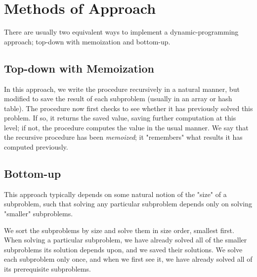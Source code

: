 \newpage
\section{Methods of Approach}
There are usually two equivalent ways to implement a dynamic-programming
approach; top-down with memoization and bottom-up.

\subsection{Top-down with Memoization}
In this approach, we write the procedure recursively in a natural manner, but
modified to save the result of each subproblem (usually in an array or hash
table). The procedure now first checks to see whether it has previously solved
this problem. If so, it returns the saved value, saving further computation at
this level; if not, the procedure computes the value in the usual manner. We
say that the recursive procedure has been \textit{memoized}; it "remembers"
what results it has computed previously.

\subsection{Bottom-up}
This approach typically depends on some natural notion of the "size" of a
subproblem, such that solving any particular subproblem depends only on
solving "smaller" subproblems.

We sort the subproblems by size and solve them in size order, smallest first.
When solving a particular subproblem, we have already solved all of the
smaller subproblems its solution depends upon, and we saved their solutions.
We solve each subproblem only once, and when we first see it, we have already
solved all of its prerequisite subproblems.


